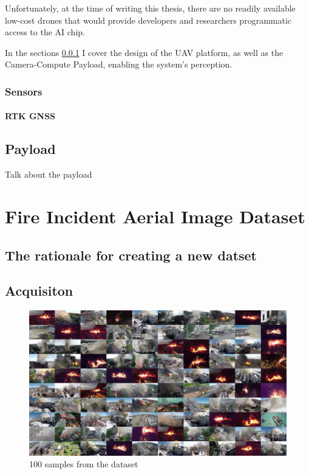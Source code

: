   Unfortunately, at the time of writing this thesis, there are no readily available low-cost drones that would provide developers and researchers
  programmatic access to the AI chip. 
  
  In the sections \ref{sec:sensors} I cover the design of the UAV platform, as well as the Camera-Compute Payload, enabling the system's perception.

  \subsubsection{Sensors}\label{sec:sensors}


  \paragraph{RTK GNSS}


  \subsection{Payload}
  Talk about the payload 


\section{Fire Incident Aerial Image Dataset}\label{sec:dataset}

  \subsection{The rationale for creating a new datset}

  \subsection{Acquisiton}
  \begin{figure}
    \includegraphics[width=\linewidth]{figures/lowres_100tiles.jpg}
    \caption{100 samples from the dataset}
  \end{figure}

